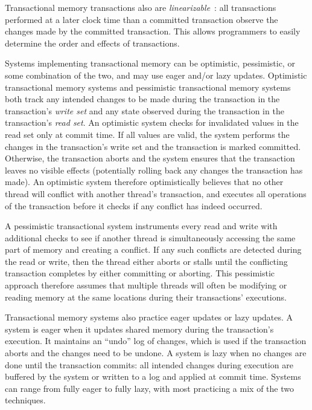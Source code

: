 Transactional memory transactions also are \emph{linearizable}~\cite{linearizability}: all transactions performed at a later clock time than a committed transaction observe the changes made by the committed transaction. This allows programmers to easily determine the order and effects of transactions.


Systems implementing transactional memory can be optimistic, pessimistic, or some combination of the two, and may use eager and/or lazy updates. 
Optimistic transactional memory systems and pessimistic transactional memory systems~\cite{harristm} both track any intended changes to be made during the transaction in the transaction's \emph{write set} and any state observed during the transaction in the transaction's \emph{read set}. 
An optimistic system checks for invalidated values in the read set only at commit time. If all values are valid, the system performs the changes in the transaction's write set and the transaction is marked committed. Otherwise, the transaction aborts and the system ensures that the transaction leaves no visible effects (potentially rolling back any changes the transaction has made). An optimistic system therefore optimistically believes that no other thread will conflict with another thread's transaction, and executes all operations of the transaction before it checks if any conflict has indeed occurred.

A pessimistic transactional system instruments every read and write with additional checks to see if another thread is simultaneously accessing the same part of memory and creating a conflict. If any such conflicts are detected during the read or write, then the thread either aborts or stalls until the conflicting transaction completes by either committing or aborting. This pessimistic approach therefore assumes that multiple threads will often be modifying or reading memory at the same locations during their transactions' executions. 

Transactional memory systems also practice eager updates or lazy updates. A system is eager when it updates shared memory during the transaction's execution. It maintains an ``undo'' log of changes, which is used if the transaction aborts and the changes need to be undone. A system is lazy when no changes are done until the transaction commits: all intended changes during execution are buffered by the system or written to a log and applied at commit time. Systems can range from fully eager to fully lazy, with most practicing a mix of the two techniques.

